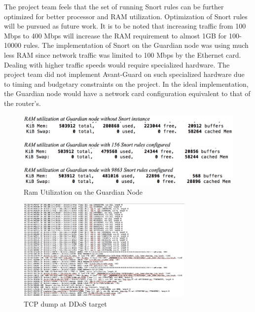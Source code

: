 The project team  feels that the set of running Snort rules can be further optimized for better processor and RAM utilization. Optimization of Snort rules will be pursued as future work. It is to be noted that increasing traffic from 100 Mbps to 400 Mbps will increase the RAM requirement to almost 1GB for 100-10000 rules. The implementation of Snort on the Guardian node was using much less RAM since network traffic was limited to 100 Mbps by the Ethernet card. Dealing with higher traffic speeds would require specialized hardware. The project team did not implement Avant-Guard on such specialized hardware due to timing and budgetary constraints on the project. In the ideal implementation, the Guardian node would have a network card configuration equivalent to that of the router's.

\begin{figure}
    \centering
    \includegraphics[width=0.95\linewidth]{figs/SnortRam.png}
    \caption{Ram Utilization on the Guardian Node}
    \label{fig:ramutil}
\end{figure}

 \begin{figure}
    \centering
    \includegraphics[width=0.95\linewidth, height=5cm]{figs/tcpdump.png}
    \caption{TCP dump at DDoS target}
    \label{fig:tcpdump}
\end{figure}